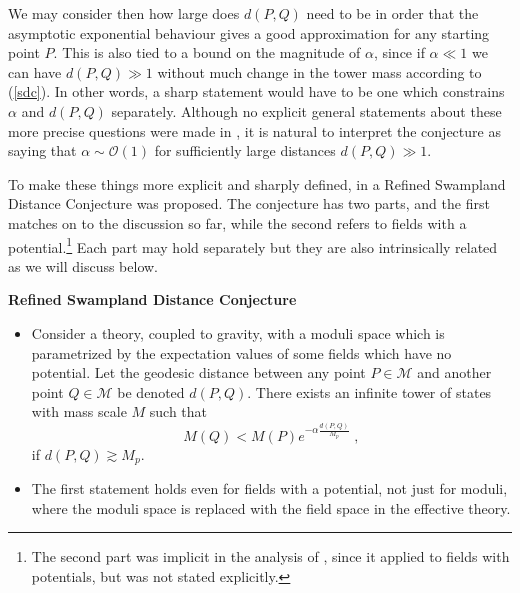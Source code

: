 \documentclass[11pt,a4paper]{article}
\numberwithin{equation}{section}
\numberwithin{table}{section}\setlength{\multlinegap}{25pt}
\newcommand{\cO}{\mathcal{O}}
\newcommand{\cM}{\mathcal M}
\newcommand{\be}{\begin{equation}}
\newcommand{\ee}{\end{equation}}
\begin{document}
We may consider then how large does  $d\left(P,Q\right)$ need to be in order that the asymptotic exponential behaviour gives a good approximation for any starting point $P$. This is also tied to a bound on the magnitude of $\alpha$, since if $\alpha \ll 1$ we can have $d\left(P,Q\right) \gg 1$ without much change in the tower mass according to (\ref{sdc}). In other words, a sharp statement would have to be one which constrains $\alpha$ and $d\left(P,Q\right)$ separately. Although no explicit general statements about these more precise questions were made in \cite{Ooguri:2006in}, it is natural to interpret the conjecture as saying that $\alpha \sim \cO\left(1\right)$ for sufficiently large distances $d\left(P,Q\right) \gg 1$.  

To make these things more explicit and sharply defined, in \cite{Baume:2016psm,Klaewer:2016kiy} a Refined Swampland Distance Conjecture was proposed. The conjecture has two parts, and the first matches on to the discussion so far, while the second refers to fields with a potential.\footnote{The second part was implicit in the analysis of \cite{Baume:2016psm,Klaewer:2016kiy}, since it applied to fields with potentials, but was not stated explicitly.}  Each part may hold separately but they are also intrinsically related as we will discuss below.
\begin{tcolorbox}
{\bf Refined Swampland Distance Conjecture } \;\cite{Baume:2016psm,Klaewer:2016kiy}
{\it 
\begin{itemize}
\item Consider a theory, coupled to gravity, with a moduli space which is parametrized by the expectation values of some fields which have no potential. Let the geodesic distance between any point $P \in \cM$ and another point $Q \in \cM$ be denoted $d\left(P,Q\right)$. There exists an infinite tower of states with mass scale $M$ such that 
\be
\label{rsdc}
M\left(Q\right) < M\left(P\right) e^{-\alpha \frac{d \left( P,Q \right)}{M_p}} \;,
\ee 
if $d \left(P,Q\right) \gtrsim M_p$. 
\item The first statement holds even for fields with a potential, not just for moduli, where the moduli space is replaced with the field space in the effective theory. 
\end{itemize}
}
\end{tcolorbox}
\end{document}

